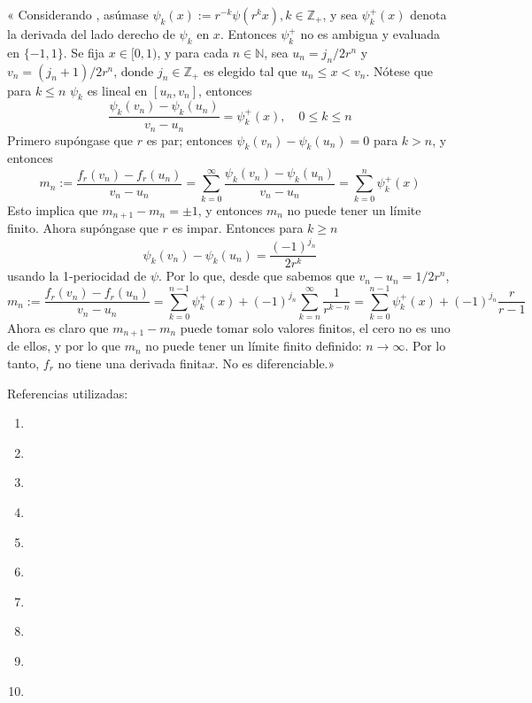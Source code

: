 « Considerando \cite{billingsley1982van}, asúmase $\psi_{k}(x):=r^{-k} \psi\left(r^{k} x\right), k \in \mathbb{Z}_{+}$, y sea $\psi_{k}^{+}(x)$ denota la derivada del lado derecho de $\psi_{k}$ en $x$. Entonces $\psi_{k}^{+}$ no es ambigua y evaluada en $\{-1,1\}$. Se fija $x \in[0,1)$, y para cada $n \in \mathbb{N}$, sea $u_{n}=j_{n} / 2 r^{n}$ y $v_{n}=\left(j_{n}+1\right) / 2 r^{n}$, donde $j_{n} \in \mathbb{Z}_{+}$  es elegido tal que $u_{n} \leq x<v_{n} .$ Nótese que para $k \leq n$ $\psi_{k}$ es lineal en $\left[u_{n}, v_{n}\right]$, entonces
$$
\frac{\psi_{k}\left(v_{n}\right)-\psi_{k}\left(u_{n}\right)}{v_{n}-u_{n}}=\psi_{k}^{+}(x), \quad 0 \leq k \leq n
$$
Primero supóngase que $r$ es par; entonces $\psi_{k}\left(v_{n}\right)-\psi_{k}\left(u_{n}\right)=0$ para $k>n$, y entonces
$$
m_{n}:=\frac{f_{r}\left(v_{n}\right)-f_{r}\left(u_{n}\right)}{v_{n}-u_{n}}=\sum_{k=0}^{\infty} \frac{\psi_{k}\left(v_{n}\right)-\psi_{k}\left(u_{n}\right)}{v_{n}-u_{n}}=\sum_{k=0}^{n} \psi_{k}^{+}(x)
$$
Esto implica que $m_{n+1}-m_{n}=\pm 1$, y entonces $m_{n}$ no puede tener un límite finito. Ahora supóngase que $r$ es impar. Entonces para $k \geq n$
$$
\psi_{k}\left(v_{n}\right)-\psi_{k}\left(u_{n}\right)=\frac{(-1)^{j_{n}}}{2 r^{k}}
$$
usando la 1-periocidad de $\psi .$ Por lo que, desde que sabemos que $v_{n}-u_{n}=1 / 2 r^{n}$,
$$
m_{n}:=\frac{f_{r}\left(v_{n}\right)-f_{r}\left(u_{n}\right)}{v_{n}-u_{n}}=\sum_{k=0}^{n-1} \psi_{k}^{+}(x)+(-1)^{j_{n}} \sum_{k=n}^{\infty} \frac{1}{r^{k-n}}=\sum_{k=0}^{n-1} \psi_{k}^{+}(x)+(-1)^{j_{n}} \frac{r}{r-1}
$$
Ahora es claro que $m_{n+1}-m_{n}$  puede tomar solo valores finitos, el cero no es uno de ellos, y por lo que $m_{n}$ no puede tener un límite finito definido: $n \rightarrow \infty$. Por lo tanto, $f_{r}$ no tiene una derivada finita$x$. No es diferenciable.»



\newpage
Referencias utilizadas: 

\begin{enumerate}
    \item \cite{allaart2012takagi}
    \item \cite{allaart2014level}
    \item \cite{bl1930einfaches}
    \item \cite{hailpern1976continuous}
    \item \cite{jarnicki2015continuous}
    \item \cite{rajwade2007surprises}
    \item \cite{takagi1973simple}
    \item \cite{bl1930einfaches}
    \item \cite{shidfar1990holder}
    \item \cite{billingsley1982van}
\end{enumerate}






